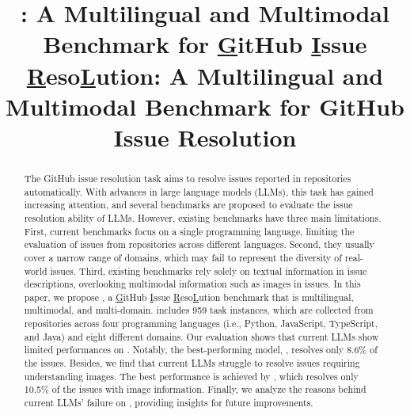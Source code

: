 \documentclass[acmsmall,screen,review,anonymous]{acmart}
\begin{document}
\title{\Swebenchx: A Multilingual and Multimodal Benchmark for \underline{G}itHub \underline{I}ssue \underline{R}eso\underline{L}ution}
\title{\Swebenchx: A Multilingual and Multimodal Benchmark for GitHub Issue Resolution}

\renewcommand{\shortauthors}{Trovato et al.}

\begin{abstract}
The GitHub issue resolution task aims to resolve issues reported in repositories automatically. With advances in large language models (LLMs), this task has gained increasing attention, and several benchmarks are proposed to evaluate the issue resolution ability of LLMs. However, existing benchmarks have three main limitations. First, current benchmarks focus on a single programming language, limiting the evaluation of issues from repositories across different languages. Second, they usually cover a narrow range of domains, which may fail to represent the diversity of real-world issues. Third, existing benchmarks rely solely on textual information in issue descriptions, overlooking multimodal information such as images in issues. In this paper, we propose \Swebenchx, a \underline{G}itHub \underline{I}ssue \underline{R}eso\underline{L}ution benchmark that is multilingual, multimodal, and multi-domain.  \Swebenchx includes 959 task instances, which are collected from repositories across four programming languages (i.e., Python, JavaScript, TypeScript, and Java) and eight different domains. Our evaluation shows that current LLMs show limited performances on \Swebenchx. Notably, the best-performing model, \GPT, resolves only 8.6\% of the issues. Besides, we find that current LLMs struggle to resolve issues requiring understanding images. The best performance is achieved by \Claude, which resolves only 10.5\% of the issues with image information. Finally, we analyze the reasons behind current LLMs' failure on \Swebenchx, providing insights for future improvements.
\end{abstract}
\end{document}
